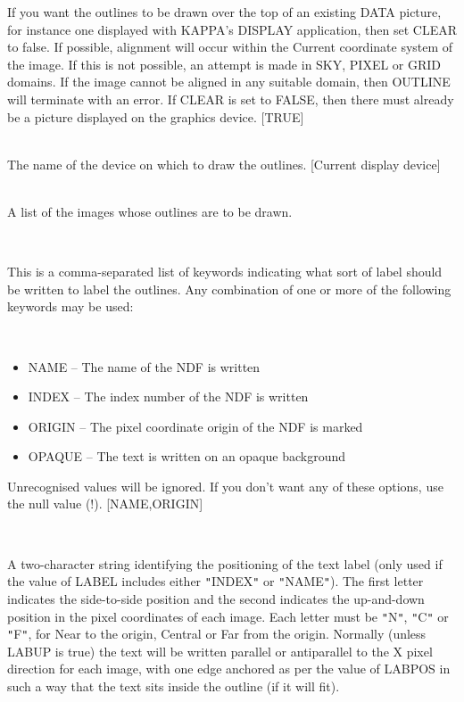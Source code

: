 \documentclass[twoside,11pt]{article}
\newcommand{\xref}[3]{#1}
\renewcommand{\_}{\texttt{\symbol{95}}}
\newcommand{\sstsubsection}[1]{ \item[{#1}] \mbox{} \\}
\newcommand{\sstitemlist}[1]{
  \mbox{} \\
  \vspace{-3.5ex}
  \begin{itemize}
     #1
  \end{itemize}
}
\newcommand{\sstitem}{\item}
\newcommand{\sstsubsection}[1]{\item[{#1}]}
\newcommand{\sstitemlist}[1]{
      \begin{itemize}
         #1
      \end{itemize}
      \\
   }
\newcommand{\sstitem}{\item}
\begin{document}
{{{         If you want the outlines to be drawn over the top
         of an existing DATA picture, for instance one displayed with
         KAPPA's \xref{DISPLAY}{sun95}{DISPLAY} application, then set CLEAR to false.  If
         possible, alignment will occur within the Current coordinate
         system of the image.  If this is not possible, an attempt is
         made in SKY, PIXEL or GRID domains.  If the image cannot be
         aligned in any suitable domain, then OUTLINE will terminate
         with an error.  If CLEAR is set to FALSE, then there must
         already be a picture displayed on the graphics device.
         [TRUE]
      }
      \sstsubsection{
         DEVICE = DEVICE (Read)
      }{
         The name of the device on which to draw the outlines.
         [Current display device]
      }
      \sstsubsection{
         IN = LITERAL (Read)
      }{
         A list of the images whose outlines are to be drawn.
      }
      \sstsubsection{
         LABMODE = LITERAL( $*$ ) (Read)
      }{
         This is a comma-separated list of keywords indicating what
         sort of label should be written to label the outlines.
         Any combination of one or more of the following keywords may
         be used:
         \sstitemlist{

            \sstitem
               NAME   -- The name of the NDF is written

            \sstitem
               INDEX  -- The index number of the NDF is written

            \sstitem
               ORIGIN -- The pixel coordinate origin of the NDF is marked

            \sstitem
               OPAQUE -- The text is written on an opaque background

         }
         Unrecognised values will be ignored.  If you don't want any
         of these options, use the null value (!).
         [NAME,ORIGIN]
      }
      \sstsubsection{
         LABPOS = LITERAL (Read)
      }{
         A two-character string identifying the positioning of the text
         label (only used if the value of LABEL includes either {\tt "}INDEX{\tt "}
         or {\tt "}NAME{\tt "}).  The first letter indicates the side-to-side
         position and the second indicates the up-and-down position
         in the pixel coordinates of each image.  Each letter must be
         {\tt "}N{\tt "}, {\tt "}C{\tt "} or {\tt "}F{\tt "}, for Near to the origin, Central or Far from
         the origin.  Normally (unless LABUP is true) the text
         will be written parallel or antiparallel to the X pixel
         direction for each image, with one edge anchored as per the
         value of LABPOS in such a way that the text sits inside the
         outline (if it will fit).

}}}
\end{document}
